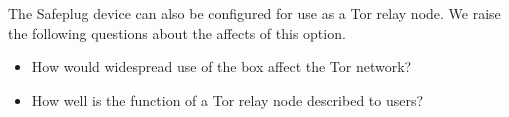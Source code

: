 The Safeplug device can also be configured for use as a Tor relay node.  We raise the following questions about the affects of this option.

\begin{itemize}
\item How would widespread use of the box affect the Tor network?
\item How well is the function of a Tor relay node described to users?
\end{itemize}


